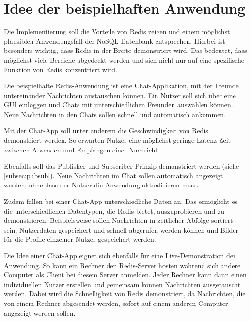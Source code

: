 
\section{Idee der beispielhaften Anwendung}

Die Implementierung soll die Vorteile von \ac{Redis} zeigen und einem möglichst plausiblen Anwendungsfall der \ac{NoSQL-Datenbank} entsprechen. Hierbei ist besonders wichtig, dass \ac{Redis} in der Breite demonstriert wird. Das bedeutet, dass möglichst viele Bereiche abgedeckt werden und sich nicht nur auf eine spezifische Funktion von \ac{Redis} konzentriert wird.

Die beispielhafte \ac{Redis}-Anwendung ist eine Chat-Applikation, mit der Freunde untereinander Nachrichten austauschen können. Ein Nutzer soll sich über eine \ac{GUI} einloggen und Chats mit unterschiedlichen Freunden auswählen können. Neue Nachrichten in den Chats sollen schnell und automatisch ankommen. 

Mit der Chat-App soll unter anderem die Geschwindigkeit von \ac{Redis} demonstriert werden. So erwarten Nutzer eine möglichst geringe Latenz-Zeit zwischen Absenden und Empfangen einer Nachricht. 

Ebenfalls soll das Publisher und Subscriber Prinzip demonstriert werden (siehe \autoref{subsec:pubsub}). Neue Nachrichten im Chat sollen automatisch angezeigt werden, ohne dass der Nutzer die Anwendung aktualisieren muss.

Zudem fallen bei einer Chat-App unterschiedliche Daten an. Das ermöglicht es die unterschiedlichen Datentypen, die \ac{Redis} bietet, auszuprobieren und zu demonstrieren. Beispielsweise sollen Nachrichten in zeitlicher Abfolge sortiert sein, Nutzerdaten gespeichert und schnell abgerufen werden können und Bilder für die Profile einzelner Nutzer gespeichert werden.

\newpage

Die Idee einer Chat-App eignet sich ebenfalls für eine Live-Demonstration der Anwendung. So kann ein Rechner den \ac{Redis}-Server hosten während sich andere Computer als Client bei diesem Server anmelden. Jeder Rechner kann dann einen individuellen Nutzer erstellen und gemeinsam können Nachrichten ausgetauscht werden. Dabei wird die Schnelligkeit von \ac{Redis} demonstriert, da Nachrichten, die von einem Rechner abgesendet werden, sofort auf einem anderen Computer angezeigt werden sollen.